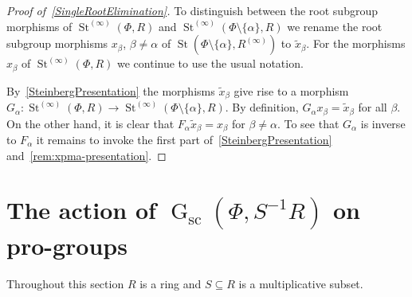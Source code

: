 \documentclass[oneside, 11pt]{amsart}
\numberwithin{equation}{section}
\newtheorem{corollary}[lemma]{Corollary}
\theoremstyle{definition}
\theoremstyle{remark}
\DeclareMathOperator\St{St}
\DeclareMathOperator\GG{G}
\begin{document}
\begin{proof}[Proof of~\cref{SingleRootElimination}]
To distinguish between the root subgroup morphisms of $\St^{(\infty)}(\Phi, R)$ and $\St^{(\infty)}(\Phi\setminus\{\alpha\}, R)$ we rename the root subgroup morphisms $x_\beta$, $\beta\neq \alpha$ of $\St(\Phi\setminus\{\alpha\}, R^{(\infty)})$ to $\widetilde{x}_{\beta}$. For the morphisms $x_\beta$ of $\St^{(\infty)}(\Phi, R)$ we continue to use the usual notation. 

By~\cref{SteinbergPresentation} the morphisms $\widetilde{x}_{\beta}$ give rise to a morphism $G_\alpha \colon \St^{(\infty)}(\Phi, R) \to \St^{(\infty)}(\Phi\setminus\{\alpha\}, R)$. By definition, $G_\alpha x_\beta = \widetilde{x}_\beta$ for all $\beta$. On the other hand, it is clear that $F_\alpha \widetilde{x}_\beta = x_\beta$ for $\beta\neq \alpha$. To see that $G_\alpha$ is inverse to $F_\alpha$ it remains to invoke the first part of~\cref{SteinbergPresentation} and~\cref{rem:xpma-presentation}.
\end{proof}


\section{The action of \texorpdfstring{$\GG_{\mathrm{sc}}(\Phi, S^{-1}R)$}{G(Ф, R)} on pro-groups} \label{sec:local-action}
Throughout this section \(R\) is a ring and \(S \subseteq R\) is a multiplicative subset.
\end{document}
